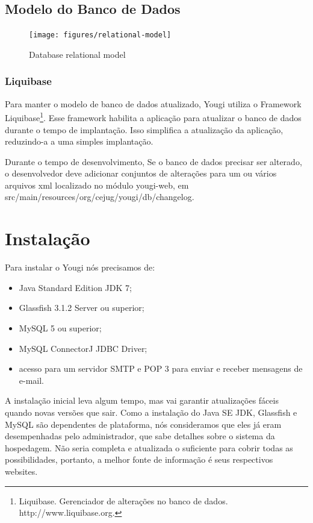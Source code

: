 \documentclass[envcountsame,envcountchap]{svmono}
\begin{document}
\section{Modelo do Banco de Dados}

\begin{figure}
\centering
\texttt{[image: figures/relational-model]}
\caption{Database relational model}
\label{fig:relational-model}
\end{figure}

\subsection{Liquibase}

Para manter o modelo de banco de dados atualizado, Yougi utiliza o Framework Liquibase\footnote{Liquibase. Gerenciador de alterações no banco de dados.  http://www.liquibase.org.}. Esse framework habilita a aplicação para atualizar o banco de dados durante o tempo de implantação. Isso simplifica a atualização da aplicação, reduzindo-a a uma simples implantação.

Durante o tempo de desenvolvimento, Se o banco de dados precisar ser alterado, o desenvolvedor deve adicionar conjuntos de alterações para um ou vários arquivos xml localizado no módulo yougi-web, em src/main/resources/org/cejug/yougi/db/changelog.

\chapter{Instalação}

Para instalar o Yougi nós precisamos de:

\begin{itemize}
\item Java Standard Edition JDK 7;
\item Glassfish 3.1.2 Server ou superior;
\item MySQL 5 ou superior;
\item MySQL ConnectorJ JDBC Driver;
\item acesso para um servidor SMTP e POP 3 para enviar e receber 			  mensagens de e-mail.
\end{itemize}

A instalação inicial leva algum tempo, mas vai garantir atualizações fáceis quando novas versões que sair. Como a instalação do Java SE JDK, Glassfish e MySQL são dependentes de plataforma, nós consideramos que eles já eram desempenhadas pelo administrador, que sabe detalhes sobre o sistema da hospedagem. Não seria completa e atualizada o suficiente para cobrir todas as possibilidades, portanto, a melhor fonte de informação é seus respectivos websites.
\end{document}
